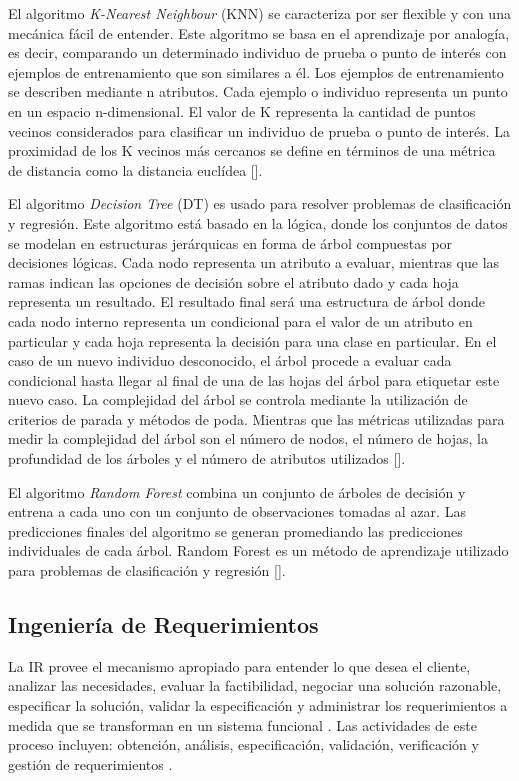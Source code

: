 \documentclass[journal]{IEEEtran}
\begin{document}
El algoritmo \textit{K-Nearest Neighbour} (KNN) se caracteriza por ser flexible y con una mecánica fácil de entender. Este algoritmo se basa en el aprendizaje por analogía, es decir, comparando un determinado individuo de prueba o punto de interés con ejemplos de entrenamiento que son similares a él. Los ejemplos de entrenamiento se describen mediante n atributos. Cada ejemplo o individuo representa un punto en un espacio n-dimensional. El valor de K representa la cantidad de puntos vecinos considerados para clasificar un individuo de prueba o  punto de interés. La proximidad de los K vecinos más cercanos se define en términos de una métrica de distancia como la distancia euclídea [].  

El algoritmo \textit{Decision Tree} (DT) es usado para resolver problemas de clasificación y regresión. Este algoritmo está basado en la lógica, donde los conjuntos de datos se modelan en estructuras jerárquicas en forma de árbol compuestas por decisiones lógicas. Cada nodo representa un atributo a evaluar, mientras que las ramas indican las opciones de decisión sobre el atributo dado y cada hoja representa un resultado. El resultado final será una estructura de árbol donde cada nodo interno representa un condicional para el valor de un atributo en particular y cada hoja representa la decisión para una clase en particular. En el caso de un nuevo individuo desconocido, el árbol procede a evaluar cada condicional hasta llegar al final de una de las hojas del árbol para etiquetar este nuevo caso. La complejidad del árbol se controla mediante la utilización de criterios de parada y métodos de  poda. Mientras que las métricas utilizadas para medir la complejidad del árbol son el número de nodos, el número de hojas, la profundidad de los árboles y el número de atributos utilizados []. 

El algoritmo \textit{Random Forest} combina un conjunto de árboles de decisión y entrena a cada uno con un conjunto de observaciones tomadas al azar. Las predicciones finales del algoritmo se generan promediando las predicciones individuales de cada árbol.  Random Forest es un método de aprendizaje utilizado para problemas de clasificación y regresión []. 

\subsection{Ingeniería de Requerimientos}

La IR provee el mecanismo apropiado para entender lo que desea el cliente, analizar las necesidades, evaluar la factibilidad, negociar una solución razonable, especificar la solución, validar la especificación y administrar los requerimientos a medida que se transforman en un sistema funcional \cite{thayer1997software}. Las actividades de este proceso incluyen: obtención, análisis, especificación, validación, verificación y gestión de requerimientos \cite{Pohl2010}.
\end{document}
